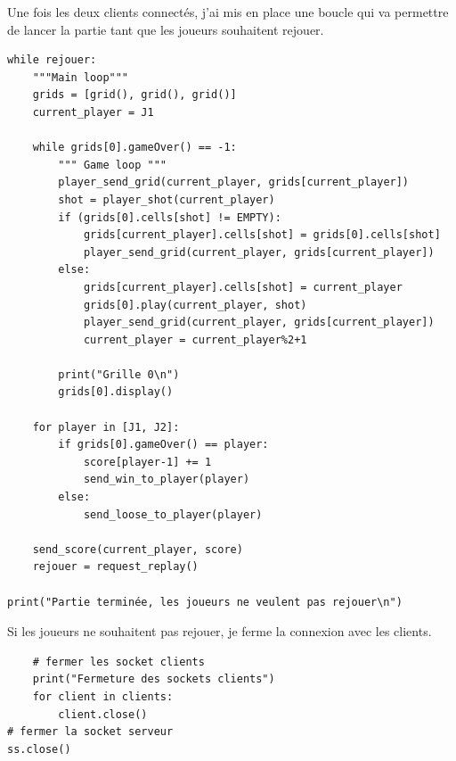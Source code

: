 \documentclass{article}
\begin{document}
Une fois les deux clients connectés, j'ai mis en place une boucle qui va permettre de lancer la partie tant que les joueurs souhaitent rejouer.\\
\begin{lstlisting}
while rejouer:
    """Main loop"""
    grids = [grid(), grid(), grid()]
    current_player = J1
    
    while grids[0].gameOver() == -1:
        """ Game loop """
        player_send_grid(current_player, grids[current_player])
        shot = player_shot(current_player)
        if (grids[0].cells[shot] != EMPTY):
            grids[current_player].cells[shot] = grids[0].cells[shot]
            player_send_grid(current_player, grids[current_player])
        else:
            grids[current_player].cells[shot] = current_player
            grids[0].play(current_player, shot)
            player_send_grid(current_player, grids[current_player])
            current_player = current_player%2+1
        
        print("Grille 0\n")
        grids[0].display()

    for player in [J1, J2]:
        if grids[0].gameOver() == player:
            score[player-1] += 1
            send_win_to_player(player)
        else:
            send_loose_to_player(player)

    send_score(current_player, score)
    rejouer = request_replay()
            
print("Partie terminée, les joueurs ne veulent pas rejouer\n")
\end{lstlisting}
Si les joueurs ne souhaitent pas rejouer, je ferme la connexion avec les clients.\\
\begin{lstlisting}
    # fermer les socket clients
    print("Fermeture des sockets clients")
    for client in clients:
        client.close()
# fermer la socket serveur
ss.close()
\end{lstlisting}
\end{document}

